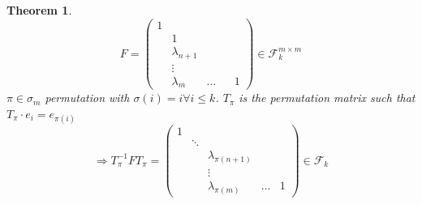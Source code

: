 \documentclass[a4paper,landscape,twocolumn]{article}
\newtheorem{theorem}{Theorem}
\begin{document}
\begin{theorem}
  \label{lemma-6.50}
  \[
    F = \begin{pmatrix}
      1 &   & & & \\
        & 1 & & & \\
        & \lambda_{n+1} & & & \\
        & \vdots & & & \\
        & \lambda_{m} & \ldots & & 1
    \end{pmatrix}
    \in {\mathcal F}_k^{m\times m}
  \]
  $\pi \in \sigma_m$ permutation with $\sigma(i) = i \forall i \leq k$.
  $T_\pi$ is the permutation matrix such that $T_\pi \cdot e_i = e_{\pi(i)}$
  \[
    \Rightarrow T_\pi^{-1} F T_\pi = \begin{pmatrix}
      1 & & & & \\
        & \ddots &  & & \\
        & & \lambda_{\pi(n+1)} & & \\
        & & \vdots & & \\
        & & \lambda_{\pi(m)} & \ldots & 1
    \end{pmatrix}
    \in {\mathcal F}_k
  \]
\end{theorem}
\end{document}

